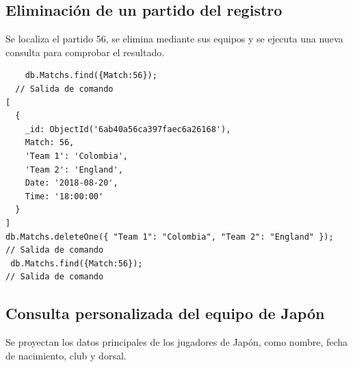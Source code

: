 \subsection{Eliminación de un partido del registro}
Se localiza el partido 56, se elimina mediante sus equipos y se ejecuta una nueva consulta para comprobar el resultado.
\begin{lstlisting}
    db.Matchs.find({Match:56});
  // Salida de comando
[
  {
    _id: ObjectId('6ab40a56ca397faec6a26168'),
    Match: 56,
    'Team 1': 'Colombia',
    'Team 2': 'England',
    Date: '2018-08-20',
    Time: '18:00:00'
  }
]
db.Matchs.deleteOne({ "Team 1": "Colombia", "Team 2": "England" });
// Salida de comando
 db.Matchs.find({Match:56});
// Salida de comando
\end{lstlisting}
\subsection{Consulta personalizada del equipo de Japón}
Se proyectan los datos principales de los jugadores de Japón, como nombre, fecha de nacimiento, club y dorsal.
